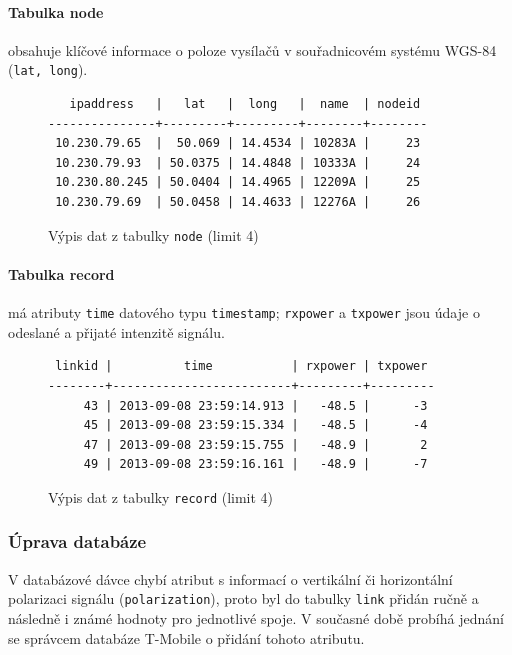 \documentclass[a4paper,12pt,oneside]{report}
\begin{document}
\paragraph*{Tabulka node} obsahuje klíčové informace o poloze vysílačů
v souřadnicovém systému WGS-84 (\texttt{lat, long}).

\begin{figure}[h!]
\centering
\footnotesize
\begin{BVerbatim}
   ipaddress   |   lat   |  long   |  name  | nodeid 
---------------+---------+---------+--------+--------
 10.230.79.65  |  50.069 | 14.4534 | 10283A |     23
 10.230.79.93  | 50.0375 | 14.4848 | 10333A |     24
 10.230.80.245 | 50.0404 | 14.4965 | 12209A |     25
 10.230.79.69  | 50.0458 | 14.4633 | 12276A |     26
\end{BVerbatim}
\caption{Výpis dat z tabulky  \texttt{node} (limit 4)}
\end{figure}

\paragraph*{Tabulka record} má atributy \texttt{time} datového typu
\texttt{timestamp}; \texttt{rxpower} a \texttt{txpower} jsou údaje o
odeslané a přijaté intenzitě signálu.

\begin{figure}[h!]
\centering
\footnotesize
\begin{BVerbatim}
 linkid |          time           | rxpower | txpower 
--------+-------------------------+---------+---------
     43 | 2013-09-08 23:59:14.913 |   -48.5 |      -3
     45 | 2013-09-08 23:59:15.334 |   -48.5 |      -4
     47 | 2013-09-08 23:59:15.755 |   -48.9 |       2
     49 | 2013-09-08 23:59:16.161 |   -48.9 |      -7
\end{BVerbatim}
\caption{Výpis dat z tabulky \texttt{record} (limit 4) }
\end{figure}




\subsubsection*{Úprava databáze}
\label{subsubsec:upravadatabaze}  
V databázové dávce chybí atribut s informací o vertikální či
horizontální polarizaci signálu (\texttt{polarization}), proto byl do
tabulky \texttt{link} přidán ručně a následně i známé hodnoty pro
jednotlivé spoje. V současné době probíhá jednání se správcem databáze
T-Mobile o přidání tohoto atributu.
 
\end{document}
